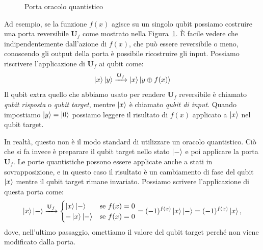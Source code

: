 \begin{figure}
	\centering
	\vspace{.3cm}
	\caption{Porta oracolo quantistico}
	\label{fig:oracle}
\end{figure}
Ad esempio, se la funzione $f(x)$ agisce su un singolo qubit possiamo costruire una porta reversibile $\mathbf{U}_f$ come mostrato nella Figura~\ref{fig:oracle}. È facile vedere che indipendentemente dall'azione di $f(x)$, che può essere reversibile o meno, conoscendo gli output della porta è possibile ricostruire gli input. Possiamo riscrivere l'applicazione di $\mathbf{U}_f$ ai qubit come:
\[
\Ket{x}\Ket{y} \xrightarrow{\mathbf{U}_f} \Ket{x}\Ket{y \oplus f(x)}
\]
Il qubit extra \textemdash{}quello che abbiamo usato per rendere $\mathbf{U}_f$ reversibile\textemdash{} è chiamato \emph{qubit risposta} o \emph{qubit target}, mentre $\Ket{x}$ è chiamato \emph{qubit di input}. Quando impostiamo $\Ket{y} = \Ket{0}$ possiamo leggere il risultato di $f(x)$ applicato a $\Ket{x}$ nel qubit target.

In realtà, questo non è il modo standard di utilizzare un oracolo quantistico. Ciò che si fa invece è preparare il qubit target nello stato $\Ket{-}$ e poi applicare la porta $\mathbf{U}_f$. Le porte quantistiche possono essere applicate anche a stati in sovrapposizione, e in questo caso il risultato è un cambiamento di fase del qubit $\Ket{x}$ mentre il qubit target rimane invariato. Possiamo scrivere l'applicazione di questa porta come:
\[
\Ket{x} \Ket{-}\xrightarrow{\mathbf{U}_f} 
\begin{cases}
	\Ket{x} \Ket{-} & \text{se $f(x)=0$} \\
	-\Ket{x} \Ket{-} & \text{se $f(x)=0$}
\end{cases} = 
(-1)^{f(x)}\Ket{x} \Ket{-} = (-1)^{f(x)}\Ket{x},
\]
dove, nell'ultimo passaggio, omettiamo il valore del qubit target perché non viene modificato dalla porta.

